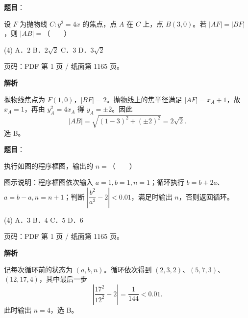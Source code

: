 \begin{answer}

\textbf{题目}：

设 $F$ 为抛物线 $C:y^2=4x$ 的焦点，点 $A$ 在 $C$ 上，点 $B(3,0)$。若 $|AF|=|BF|$，则 $|AB|=$\mbox{（　　）}

\begin{gkopts}(4)
\task A．$2$
\task B．$2\sqrt2$
\task C．$3$
\task D．$3\sqrt2$
\end{gkopts}

\begin{gktip}
页码：PDF 第 1 页 / 纸面第 1165 页。
\end{gktip}

\textbf{解析}

抛物线焦点为 $F(1,0)$，$|BF|=2$。抛物线上的焦半径满足 $|AF|=x_A+1$，故 $x_A=1$，再由 $y_A^2=4x_A$ 得 $y_A=\pm2$。因此
\nopagebreak[4]
\[
|AB|=\sqrt{(1-3)^2+(\pm2)^2}=2\sqrt2.
\]
选 B。


\end{answer}
\begin{answer}

\textbf{题目}：

执行如图的程序框图，输出的 $n=$\mbox{（　　）}

\begin{gktip}
图示说明：程序框图依次输入 $a=1,b=1,n=1$；循环执行 $b=b+2a$、$a=b-a,n=n+1$；判断 $\left|\dfrac{b^2}{a^2}-2\right|<0.01$，满足时输出 $n$，否则返回循环。
\end{gktip}
\nopagebreak[4]
\begin{center}\end{center}
\nopagebreak[4]
\begin{gkopts}(4)
\task A．$3$
\task B．$4$
\task C．$5$
\task D．$6$
\end{gkopts}

\begin{gktip}
页码：PDF 第 1 页 / 纸面第 1165 页。
\end{gktip}

\textbf{解析}

记每次循环前的状态为 $(a,b,n)$。循环依次得到 $(2,3,2)$、$(5,7,3)$、$(12,17,4)$，其中最后一步
\nopagebreak[4]
\[
\left|\frac{17^2}{12^2}-2\right|=\frac1{144}<0.01.
\]
此时输出 $n=4$，选 B。


\end{answer}
